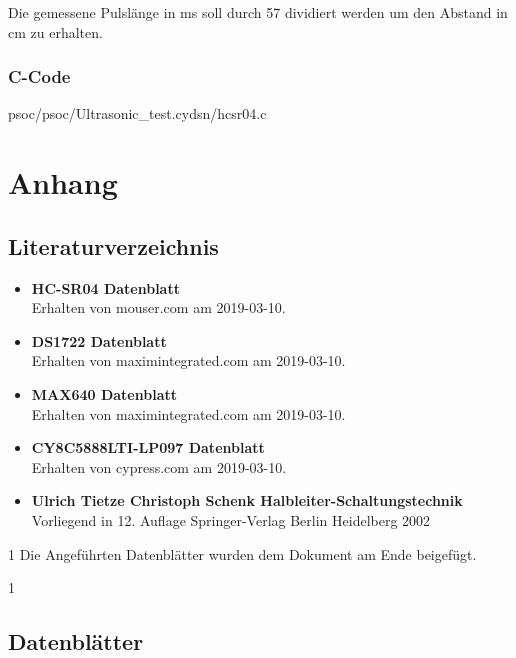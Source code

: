 \documentclass[12pt,a4paper]{article}
\def\datasheets{0}
\begin{document}
	Die gemessene Pulslänge in ms soll durch 57 dividiert werden um den
	Abstand in cm zu erhalten.

	\subsubsection{C-Code}

	
	{psoc/psoc/Ultrasonic_test.cydsn/hcsr04.c}

	
	

\section{Anhang}

\subsection{Literaturverzeichnis}

\begin{itemize}
	
	\item{\textbf{HC-SR04 Datenblatt}}\\
		Erhalten von mouser.com am 2019-03-10.
	\item{\textbf{DS1722 Datenblatt}}\\
		Erhalten von maximintegrated.com am 2019-03-10.
	\item{\textbf{MAX640 Datenblatt}}\\
		Erhalten von maximintegrated.com am 2019-03-10.
	\item{\textbf{CY8C5888LTI-LP097 Datenblatt}}\\
		Erhalten von cypress.com am 2019-03-10.
	\item{\textbf{Ulrich Tietze Christoph Schenk 
		Halbleiter-Schaltungstechnik}}\\
		Vorliegend in 12. Auflage Springer-Verlag Berlin Heidelberg 2002

\end{itemize}

\if\datasheets1
	Die Angeführten Datenblätter wurden dem Dokument am Ende beigefügt.
\fi

\if\datasheets1
	\subsection{Datenblätter}
\end{document}
